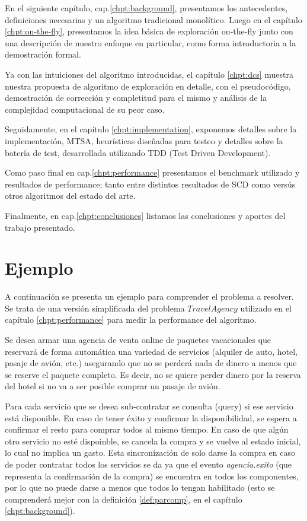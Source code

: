 En el siguiente capítulo, cap.\ref{chpt:background}, presentamos los antecedentes, definiciones necesarias y un algoritmo tradicional monolítico. Luego en el capítulo \ref{chpt:on-the-fly}, presentamos la idea básica de exploración on-the-fly junto con una descripción de nuestro enfoque en particular, como forma introductoria a la demostración formal.

Ya con las intuiciones del algoritmo introducidas, el capítulo \ref{chpt:dcs} muestra nuestra propuesta de algoritmo de exploración en detalle, con el pseudocódigo, demostración de corrección y completitud para el mismo y análisis de la complejidad computacional de su peor caso.

Seguidamente, en el capítulo \ref{chpt:implementation}, exponemos detalles sobre la implementación, MTSA, heurísticas diseñadas para testeo y detalles sobre la batería de test, desarrollada utilizando TDD (Test Driven Development).

Como paso final en cap.\ref{chpt:performance} presentamos el benchmark utilizado y resultados de performance; tanto entre distintos resultados de SCD como versús otros algoritmos del estado del arte.

Finalmente, en cap.\ref{chpt:conclusiones} listamos las conclusiones y aportes del trabajo presentado.


\section{Ejemplo}\label{chpt:casoAviones}
A continuación se presenta un ejemplo para comprender el problema a resolver. Se trata de una versión simplificada del problema $Travel Agency$ utilizado en el capítulo \ref{chpt:performance} para medir la performance del algoritmo.

Se desea armar una agencia de venta online de paquetes vacacionales que reservará de forma automática una variedad de servicios (alquiler de auto, hotel, pasaje de avión, etc.) asegurando que no se perderá nada de dinero a menos que se reserve el paquete completo. Es decir, no se quiere perder dinero por la reserva del hotel si no va a ser posible comprar un pasaje de avión.

Para cada servicio que se desea sub-contratar se consulta (query) si ese servicio está disponible. En caso de tener éxito y confirmar la disponibilidad, se espera a confirmar el resto para comprar todos al  mismo tiempo. En caso de que algún otro servicio no esté dispoinble, se cancela la compra y se vuelve al estado inicial, lo cual no implica un gasto. Esta sincronización de solo darse la compra en caso de poder contratar todos los servicios se da ya que el evento \textit{agencia.exito} (que representa la confirmación de la compra) se encuentra en todos los componentes, por lo que no puede darse a menos que todos lo tengan habilitado (esto se comprenderá mejor con la definición \ref{def:parcomp}, en el capítulo \ref{chpt:background}).

